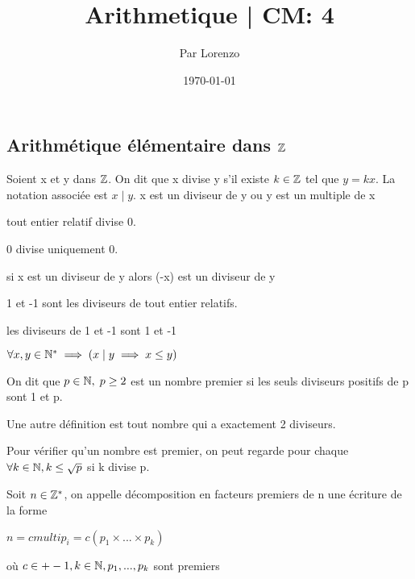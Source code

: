 \documentclass[a4paper, 12pt]{article}
\title{Arithmetique | CM: 4}
\author{Par Lorenzo}
\date{\today}
\begin{document}
\maketitle

\subsection{Arithmétique élémentaire dans $\mathbb{Z}$}

\begin{definition}
    Soient x et y dans $\mathbb{Z}$. On dit que x divise y s'il existe $k \in \mathbb{Z}$ tel que $y = kx$.
    La notation associée est $x \mid y$.
    x est un diviseur de y ou y est un multiple de x
\end{definition}

\begin{remark}
    tout entier relatif divise 0.

    0 divise uniquement 0.

    si x est un diviseur de y alors (-x) est un diviseur de y

    1 et -1 sont les diviseurs de tout entier relatifs.
    
    les diviseurs de 1 et -1 sont 1 et -1

    $\forall x, y \in \mathbb{N}^* \implies (x \mid y \implies x \leq y)$
\end{remark}

\begin{definition}
    On dit que $p \in \mathbb{N}, \; p \geq 2$ est un nombre premier si les seuls diviseurs positifs de p sont 1 et p.
\end{definition}

\begin{remark}
    Une autre définition est tout nombre qui a exactement 2 diviseurs.
\end{remark}

\begin{remark}
    Pour vérifier qu'un nombre est premier, on peut regarde pour chaque $\forall k \in \mathbb{N}, k \leq \sqrt{p}$ si k divise p.
\end{remark}


\begin{definition}
    Soit $n \in \mathbb{Z}^*$, on appelle décomposition en facteurs premiers de n une écriture de la forme

    $n = c multi p_i = c(p_1 \times ... \times p_k)$

    où $c \in {+- 1}, k \in \mathbb{N}, p_1,...,p_k$ sont premiers
\end{definition}
\end{document}
